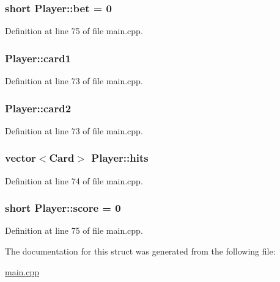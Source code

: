 \subsubsection[{\texorpdfstring{bet}{bet}}]{\setlength{\rightskip}{0pt plus 5cm}short Player\+::bet = 0}\hypertarget{struct_player_a485c5647a88538b223036a59f2896642}{}\label{struct_player_a485c5647a88538b223036a59f2896642}


Definition at line 75 of file main.\+cpp.

\subsubsection[{\texorpdfstring{card1}{card1}}]{ Player\+::card1}\hypertarget{struct_player_ad54463a3ff6b1145bdd275751003f14d}{}\label{struct_player_ad54463a3ff6b1145bdd275751003f14d}


Definition at line 73 of file main.\+cpp.

\subsubsection[{\texorpdfstring{card2}{card2}}]{ Player\+::card2}\hypertarget{struct_player_aadced5e23c348cdc02ba693ddc442c2b}{}\label{struct_player_aadced5e23c348cdc02ba693ddc442c2b}


Definition at line 73 of file main.\+cpp.

\subsubsection[{\texorpdfstring{hits}{hits}}]{\setlength{\rightskip}{0pt plus 5cm}vector$<${\bf Card}$>$ Player\+::hits}\hypertarget{struct_player_a337fa6c934d99d50d4d7e0da2380d43d}{}\label{struct_player_a337fa6c934d99d50d4d7e0da2380d43d}


Definition at line 74 of file main.\+cpp.

\subsubsection[{\texorpdfstring{score}{score}}]{\setlength{\rightskip}{0pt plus 5cm}short Player\+::score = 0}\hypertarget{struct_player_af90f47d3d6306361df521135f6f1016d}{}\label{struct_player_af90f47d3d6306361df521135f6f1016d}


Definition at line 75 of file main.\+cpp.



The documentation for this struct was generated from the following file\+:\begin{DoxyCompactItemize}
\item 
\hyperlink{main_8cpp}{main.\+cpp}\end{DoxyCompactItemize}
